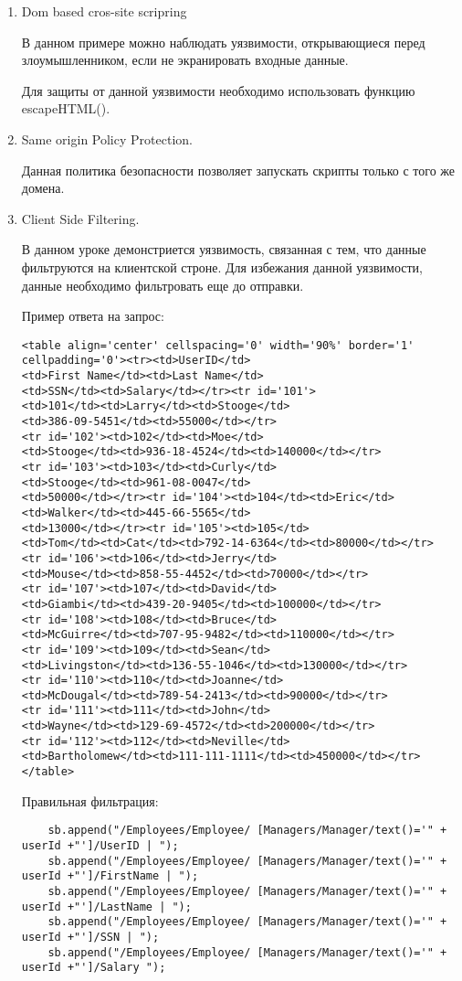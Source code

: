 \documentclass{article}
\begin{document}
\begin{enumerate}
\item Dom based cros-site scripring

В данном примере можно наблюдать уязвимости, открывающиеся перед злоумышленником, если не экранировать входные данные.

Для защиты от данной уязвимости необходимо использовать функцию escapeHTML().

\item Same origin Policy Protection. 

Данная политика безопасности позволяет запускать скрипты только с того же домена.

\item Client Side Filtering. 

В данном уроке демонстриется уязвимость, связанная с тем, что данные фильтруются на клиентской строне. Для избежания данной уязвимости, данные необходимо фильтровать еще до отправки.
 
Пример ответа на запрос:
\begin{verbatim}
<table align='center' cellspacing='0' width='90%' border='1' cellpadding='0'><tr><td>UserID</td>
<td>First Name</td><td>Last Name</td>
<td>SSN</td><td>Salary</td></tr><tr id='101'>
<td>101</td><td>Larry</td><td>Stooge</td>
<td>386-09-5451</td><td>55000</td></tr>
<tr id='102'><td>102</td><td>Moe</td>
<td>Stooge</td><td>936-18-4524</td><td>140000</td></tr>
<tr id='103'><td>103</td><td>Curly</td>
<td>Stooge</td><td>961-08-0047</td>
<td>50000</td></tr><tr id='104'><td>104</td><td>Eric</td>
<td>Walker</td><td>445-66-5565</td>
<td>13000</td></tr><tr id='105'><td>105</td>
<td>Tom</td><td>Cat</td><td>792-14-6364</td><td>80000</td></tr>
<tr id='106'><td>106</td><td>Jerry</td>
<td>Mouse</td><td>858-55-4452</td><td>70000</td></tr>
<tr id='107'><td>107</td><td>David</td>
<td>Giambi</td><td>439-20-9405</td><td>100000</td></tr>
<tr id='108'><td>108</td><td>Bruce</td>
<td>McGuirre</td><td>707-95-9482</td><td>110000</td></tr>
<tr id='109'><td>109</td><td>Sean</td>
<td>Livingston</td><td>136-55-1046</td><td>130000</td></tr>
<tr id='110'><td>110</td><td>Joanne</td>
<td>McDougal</td><td>789-54-2413</td><td>90000</td></tr>
<tr id='111'><td>111</td><td>John</td>
<td>Wayne</td><td>129-69-4572</td><td>200000</td></tr>
<tr id='112'><td>112</td><td>Neville</td>
<td>Bartholomew</td><td>111-111-1111</td><td>450000</td></tr></table>

\end{verbatim} 
 
Правильная фильтрация:
\begin{verbatim}
	sb.append("/Employees/Employee/ [Managers/Manager/text()='" + userId +"']/UserID | ");
	sb.append("/Employees/Employee/ [Managers/Manager/text()='" + userId +"']/FirstName | ");
	sb.append("/Employees/Employee/ [Managers/Manager/text()='" + userId +"']/LastName | ");
	sb.append("/Employees/Employee/ [Managers/Manager/text()='" + userId +"']/SSN | ");
	sb.append("/Employees/Employee/ [Managers/Manager/text()='" + userId +"']/Salary ");
\end{verbatim} 


\end{enumerate}
\end{document}
